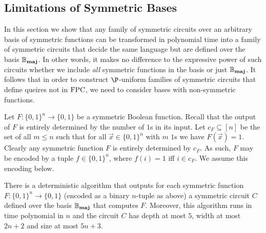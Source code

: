 \documentclass[../paper.tex]{subfiles}
\begin{document}
\subsection{Limitations of Symmetric Bases}
In this section we show that any family of symmetric circuits over an arbitrary
basis of symmetric functions can be transformed in polynomial time into a family
of symmetric circuits that decide the same language but are defined over the
basis $\mathbb{B}_{\text{\textbf{maj}}}$. In other words, it makes no difference to the expressive power of
such circuits whether we include \emph{all} symmetric functions in the basis or
just $\mathbb{B}_{\text{\textbf{maj}}}$. It follows that in order to construct $\P$-uniform families of
symmetric circuits that define queires not in $\text{\upshape FPC}$, we need to consider bases
with non-symmetric functions.


Let $F : \{0,1\}^n\rightarrow \{0,1\}$ be a symmetric Boolean function. Recall
that the output of $F$ is entirely determined by the number of $1$s in its
input. Let $c_{F} \subseteq [n]$ be the set of all $m \leq n$ such that for all
$\vec{x} \in \{ 0,1 \}^n$ with $m$ $1$s we have $F (\vec{x}) = 1$. Clearly any
symmetric function $F$ is entirely determined by $c_{F}$. As such, $F$ may be
encoded by a tuple $f \in \{0,1\}^{n}$, where $f (i) = 1 $ iff $i \in c_{F}$. We
assume this encoding below.
 
\begin{prop}
  \label{prop:fuctions-maj}
  There is a deterministic algorithm that outputs for each symmetric function
  $F: \{0,1\}^n \rightarrow \{0,1\}$ (encoded as a binary $n$-tuple as above) a
  symmetric circuit $C$ defined over the basis $\mathbb{B}_{\text{\textbf{maj}}}$ that computes $F$.
  Moreover, this algorithm runs in time polynomial in $n$ and the
  circuit $C$ has depth at most $5$, width at most $2n+2$ and size at most $5n +
  3$.
\end{prop}
\end{document}
